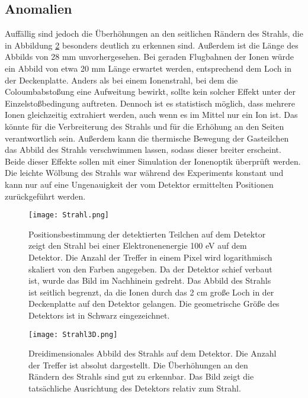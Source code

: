 \subsection{Anomalien}
\label{sec:Anomalien}
Auffällig sind jedoch die Überhöhungen an den seitlichen Rändern des Strahls, die in Abbildung \ref{fig:Strahl3D} besonders deutlich zu erkennen sind. Außerdem ist die Länge des Abbilds von 28 mm unvorhergesehen. Bei geraden Flugbahnen der Ionen würde ein Abbild von etwa 20 mm Länge erwartet werden, entsprechend dem Loch in der Deckenplatte. Anders als bei einem Ionenstrahl, bei dem die Coloumbabstoßung eine Aufweitung bewirkt, sollte kein solcher Effekt unter der Einzelstoßbedingung auftreten. Dennoch ist es statistisch möglich, dass mehrere Ionen gleichzeitig extrahiert werden, auch wenn es im Mittel nur ein Ion ist. Das könnte für die Verbreiterung des Strahls und für die Erhöhung an den Seiten verantwortlich sein. Außerdem kann die thermische Bewegung der Gasteilchen das Abbild des Strahls verschwimmen lassen, sodass dieser breiter erscheint. Beide dieser Effekte sollen mit einer Simulation der Ionenoptik überprüft werden. Die leichte Wölbung des Strahls war während des Experiments konstant und kann nur auf eine Ungenauigkeit der vom Detektor ermittelten Positionen zurückgeführt werden. 
\begin{figure}
    \centering
    \texttt{[image: Strahl.png]}
    \caption[Logarithmisches Abbild des Strahls auf dem Detektor]{Positionsbestimmung der detektierten Teilchen auf dem Detektor zeigt den Strahl bei einer Elektronenenergie 100 eV auf dem Detektor. Die Anzahl der Treffer in einem Pixel wird logarithmisch skaliert von den Farben angegeben. Da der Detektor schief verbaut ist, wurde das Bild im Nachhinein gedreht. Das Abbild des Strahls ist seitlich begrenzt, da die Ionen durch das 2 cm große Loch in der Deckenplatte auf den Detektor gelangen. Die geometrische Größe des Detektors ist in Schwarz eingezeichnet.}
    \label{fig:Strahl} 
\end{figure}

\begin{figure}
    \centering
    \texttt{[image: Strahl3D.png]}
    \caption[Dreidimensionales Abbild des Strahls auf dem Detektor]{Dreidimensionales Abbild des Strahls auf dem Detektor. Die Anzahl der Treffer ist absolut dargestellt. Die Überhöhungen an den Rändern des Strahls sind gut zu erkennbar. Das Bild zeigt die tatsächliche Ausrichtung des Detektors relativ zum Strahl.}
    \label{fig:Strahl3D} 
\end{figure}

